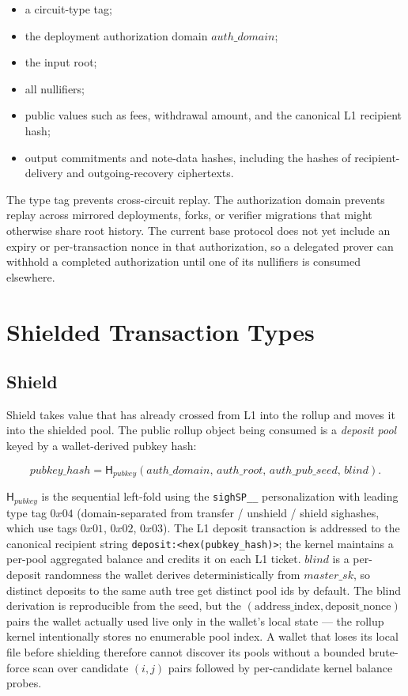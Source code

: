 \documentclass[11pt]{article}
\newcommand{\Hash}{\mathsf{H}}
\begin{document}
\begin{itemize}
  \item a circuit-type tag;
  \item the deployment authorization domain \(auth\_domain\);
  \item the input root;
  \item all nullifiers;
  \item public values such as fees, withdrawal amount, and the canonical L1
        recipient hash;
  \item output commitments and note-data hashes, including the hashes of
        recipient-delivery and outgoing-recovery ciphertexts.
\end{itemize}

The type tag prevents cross-circuit replay. The authorization domain prevents
replay across mirrored deployments, forks, or verifier migrations that might
otherwise share root history. The current base protocol does not yet include an
expiry or per-transaction nonce in that authorization, so a delegated prover
can withhold a completed authorization until one of its nullifiers is consumed
elsewhere.

\section{Shielded Transaction Types}

\subsection{Shield}

Shield takes value that has already crossed from L1 into the rollup and moves it
into the shielded pool. The public rollup object being consumed is a
\emph{deposit pool} keyed by a wallet-derived pubkey hash:

\[
pubkey\_hash = \Hash_{pubkey}(auth\_domain,\, auth\_root,\, auth\_pub\_seed,\, blind).
\]

\(\Hash_{pubkey}\) is the sequential left-fold using the \texttt{sighSP\_\_}
personalization with leading type tag \(0x04\) (domain-separated from
transfer / unshield / shield sighashes, which use tags \(0x01\), \(0x02\),
\(0x03\)). The L1 deposit transaction is addressed to the canonical
recipient string \texttt{deposit:<hex(pubkey\_hash)>}; the kernel
maintains a per-pool aggregated balance and credits it on each L1 ticket.
\(blind\) is a per-deposit randomness the wallet derives
deterministically from \(master\_sk\), so distinct deposits to the
same auth tree get distinct pool ids by default. The blind derivation
is reproducible from the seed, but the
\((\textrm{address\_index}, \textrm{deposit\_nonce})\) pairs the wallet
actually used live only in the wallet's local state — the rollup
kernel intentionally stores no enumerable pool index. A wallet that
loses its local file before shielding therefore cannot discover its
pools without a bounded brute-force scan over candidate
\((i, j)\) pairs followed by per-candidate kernel balance probes.
\end{document}
